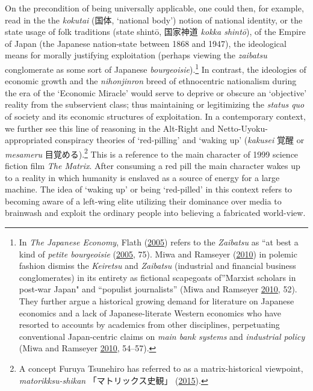 \documentclass[10pt,british,A4paper,twoside]{memoir}
\begin{document}
On the precondition of being universally applicable, one could then, for
example, read in the the \emph{kokutai} (国体, `national body') notion
of national identity, or the state usage of folk traditions (state
shintō, 国家神道 \emph{kokka shintō}), of the Empire of Japan (the
Japanese nation-state between 1868 and 1947), the ideological means for
morally justifying exploitation (perhaps viewing the \emph{zaibatsu}
conglomerate as some sort of Japanese \emph{bourgeoisie}).\footnote{In
  \emph{The Japanese Economy}, Flath
  (\protect\hyperlink{ref-flath_japanese_2005}{2005}) refers to the
  \emph{Zaibatsu} as ``at best a kind of \emph{petite bourgeoisie}
  (\protect\hyperlink{ref-flath_japanese_2005}{2005}, 75). Miwa and
  Ramseyer (\protect\hyperlink{ref-miwa_fable_2010}{2010}) in polemic
  fashion dismiss the \emph{Keiretsu} and \emph{Zaibatsu} (industrial
  and financial business conglomerates) in its entirety as fictional
  scapegoats of''Marxist scholars in post-war Japan" and ``populist
  journalists'' (Miwa and Ramseyer
  \protect\hyperlink{ref-miwa_fable_2010}{2010}, 52). They further argue
  a historical growing demand for literature on Japanese economics and a
  lack of Japanese-literate Western economics who have resorted to
  accounts by academics from other disciplines, perpetuating
  conventional Japan-centric claims on \emph{main bank systems} and
  \emph{industrial policy} (Miwa and Ramseyer
  \protect\hyperlink{ref-miwa_fable_2010}{2010}, 54--57).} In contrast,
the ideologies of economic growth and the \emph{nihonjinron} breed of
ethnocentric nationalism during the era of the `Economic Miracle' would
serve to deprive or obscure an `objective' reality from the subservient
class; thus maintaining or legitimizing the \emph{status quo} of society
and its economic structures of exploitation. In a contemporary context,
we further see this line of reasoning in the Alt-Right and
Netto-Uyoku-appropriated conspiracy theories of `red-pilling' and
`waking up' (\emph{kakusei} 覚醒 or \emph{mesameru} 目覚める).\footnote{A
  concept Furuya Tsunehiro has referred to as a matrix-historical
  viewpoint, \emph{matorikksu-shikan} 「マトリックス史観」
  (\protect\hyperlink{ref-furuya_eng._2015}{2015}).} This is a reference
to the main character of 1999 science fiction film \emph{The Matrix}.
After consuming a red pill the main character wakes up to a reality in which
humanity is enslaved as a source of energy for a large machine. The idea
of `waking up' or being `red-pilled' in this context refers to becoming
aware of a left-wing elite utilizing their dominance over
media to brainwash and exploit the ordinary people into believing a
fabricated world-view.
\end{document}
